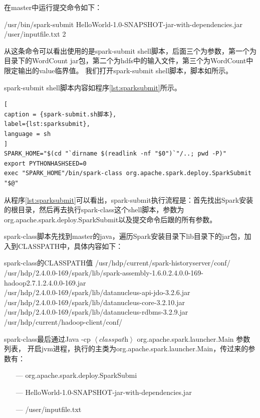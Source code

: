 在master中运行提交命令如下：
	
\begin{cmd}
/usr/bin/spark-submit
   HelloWorld-1.0-SNAPSHOT-jar-with-dependencies.jar
   /user/inputfile.txt 2
\end{cmd}

从这条命令可以看出使用的是spark-submit shell脚本，后面三个为参数，第一个为目录下的WordCount jar包，第二个为hdfs中的输入文件，第三个为WordCount中限定输出的value临界值。
我们打开spark-submit shell脚本，脚本如所示。

spark-submit shell脚本内容如程序\ref{lst:sparksubmit}所示。

\begin{lstlisting}[
caption = {spark-submit.sh脚本},
label={lst:sparksubmit},
language = sh
]
SPARK_HOME="$(cd "`dirname $(readlink -nf "$0")`"/..; pwd -P)"
export PYTHONHASHSEED=0
exec "SPARK_HOME"/bin/spark-class org.apache.spark.deploy.SparkSubmit "$@"

\end{lstlisting}

从程序\ref{lst:sparksubmit}可以看出，spark-submit执行流程是：首先找出Spark安装的根目录，然后再去执行spark-class这个shell脚本，参数为org.apache.spark.deploy.SparkSubmit以及提交命令后跟的所有参数。

spark-class脚本先找到master的java，遍历Spark安装目录下lib目录下的jar包，加入到CLASSPATH中，具体内容如下：

\begin{centertitlebox}{spark-class的CLASSPATH值}
/usr/hdp/current/spark-historyserver/conf/\\
/usr/hdp/2.4.0.0-169/spark/lib/spark-assembly-1.6.0.2.4.0.0-169-hadoop2.7.1.2.4.0.0-169.jar\\
/usr/hdp/2.4.0.0-169/spark/lib/datanucleus-api-jdo-3.2.6.jar\\
/usr/hdp/2.4.0.0-169/spark/lib/datanucleus-core-3.2.10.jar\\
/usr/hdp/2.4.0.0-169/spark/lib/datanucleus-rdbms-3.2.9.jar\\
/usr/hdp/current/hadoop-client/conf/
\end{centertitlebox}

spark-class最后通过Java -cp $\left\langle \textit{classpath} \right\rangle$ org.apache.spark.launcher.Main 参数列表，
开启jvm进程，执行的主类为org.apache.spark.launcher.Main，传过来的参数有：
\begin{itemize} 
	\item[---] org.apache.spark.deploy.SparkSubmi
	\item[---] HelloWorld-1.0-SNAPSHOT-jar-with-dependencies.jar
	\item[---] /user/inputfile.txt
\end{itemize}

